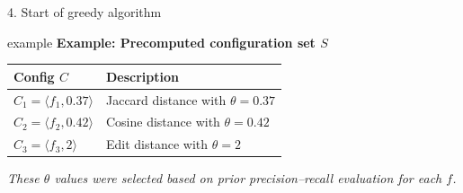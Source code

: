 \documentclass[8pt]{beamer} %
\begin{document}
\begin{frame}{4. Start of greedy algorithm}
	\vspace{0.5em}
	\begin{beamercolorbox}[rounded=true, shadow=true, leftskip=1em, rightskip=1em]{example}
		\textbf{Example: Precomputed configuration set $S$}
		\begin{tabular}{ll}
			\textbf{Config $C$} & \textbf{Description} \\
			\hline
			$C_1 = \langle f_1, 0.37 \rangle$ & Jaccard distance with $\theta = 0.37$ \\
			$C_2 = \langle f_2, 0.42 \rangle$ & Cosine distance with $\theta = 0.42$ \\
			$C_3 = \langle f_3, 2 \rangle$    & Edit distance with $\theta = 2$ \\
		\end{tabular}
		
		\vspace{0.5em}
		\textit{These $\theta$ values were selected based on prior precision–recall evaluation for each $f$.}
		
	\end{beamercolorbox}
	
\end{frame}
\end{document}
